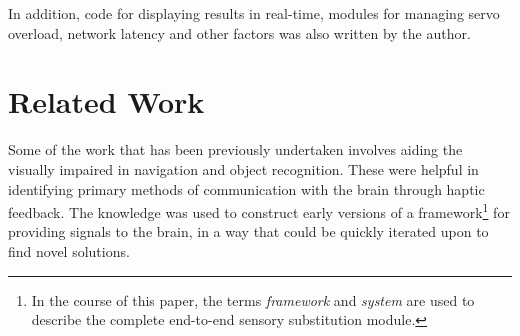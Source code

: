 \documentclass[
hidelinks,
12pt, %
oneside, %
english, %
doublespacing, %
headsepline, %
]{MastersDoctoralThesis} %
\begin{document}
In addition, code for displaying results in real-time, modules for managing servo overload, network latency and other factors was also written by the author.

\section{Related Work}

Some of the work that has been previously undertaken involves aiding the visually impaired in navigation and object recognition. These were helpful in identifying primary methods of communication with the brain through haptic feedback. The knowledge was used to construct early versions of a framework\footnote{In the course of this paper, the terms \textit{framework} and \textit{system} are used to describe the complete end-to-end sensory substitution module.} for providing signals to the brain, in a way that could be quickly iterated upon to find novel solutions.
\end{document}

